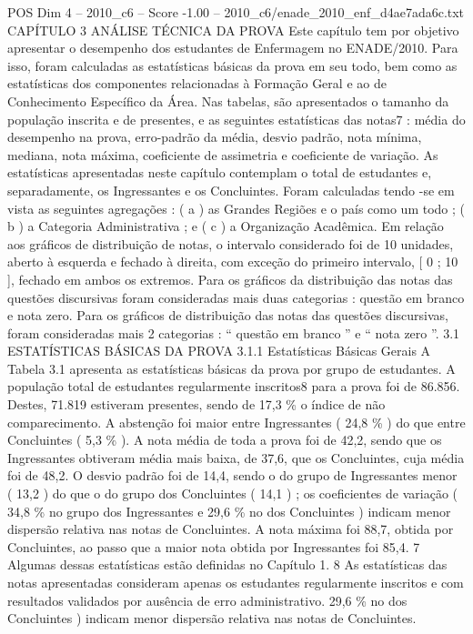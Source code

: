 \begin{textsample}{POS Dim 4 – 2010\_c6 – Score -1.00 – 2010\_c6/enade\_2010\_enf\_d4ae7ada6c.txt}  \label{ex:f4_pos_314}
CAPÍTULO 3 ANÁLISE TÉCNICA DA PROVA Este capítulo tem por objetivo apresentar o desempenho dos estudantes de Enfermagem no ENADE/2010.
Para isso, foram calculadas as estatísticas básicas da prova em seu todo, bem como as estatísticas dos componentes relacionadas à Formação Geral e ao de Conhecimento Específico da Área.
Nas tabelas, são apresentados o tamanho da população inscrita e de presentes, e as seguintes estatísticas das notas7 : média do desempenho na prova, erro-padrão da média, desvio padrão, nota mínima, mediana, nota máxima, coeficiente de assimetria e coeficiente de variação.
As estatísticas apresentadas neste capítulo contemplam o total de estudantes e, separadamente, os Ingressantes e os Concluintes.
Foram calculadas tendo -se em vista as seguintes agregações : ( a ) as Grandes Regiões e o país como um todo ; ( b ) a Categoria Administrativa ; e ( c ) a Organização Acadêmica.
Em relação aos gráficos de distribuição de notas, o intervalo considerado foi de 10 unidades, aberto à esquerda e fechado à direita, com exceção do primeiro intervalo, [ 0 ; 10 ], fechado em ambos os extremos.
Para os gráficos da distribuição das notas das questões discursivas foram consideradas mais duas categorias : questão em branco e nota zero.
Para os gráficos de distribuição das notas das questões discursivas, foram consideradas mais 2 categorias : “ questão em branco ” e “ nota zero ”. 3.1 ESTATÍSTICAS BÁSICAS DA PROVA 3.1.1 Estatísticas Básicas Gerais A Tabela 3.1 apresenta as estatísticas básicas da prova por grupo de estudantes.
A população total de estudantes regularmente inscritos8 para a prova foi de 86.856.
Destes, 71.819 estiveram presentes, sendo de 17,3 \% o índice de não comparecimento.
A abstenção foi maior entre Ingressantes ( 24,8 \% ) do que entre Concluintes ( 5,3 \% ).
A nota média de toda a prova foi de 42,2, sendo que os Ingressantes obtiveram média mais baixa, de 37,6, que os Concluintes, cuja média foi de 48,2.
O desvio padrão foi de 14,4, sendo o do grupo de Ingressantes menor ( 13,2 ) do que o do grupo dos Concluintes ( 14,1 ) ; os coeficientes de variação ( 34,8 \% no grupo dos Ingressantes e 29,6 \% no dos Concluintes ) indicam menor dispersão relativa nas notas de Concluintes.
A nota máxima foi 88,7, obtida por Concluintes, ao passo que a maior nota obtida por Ingressantes foi 85,4. 7 Algumas dessas estatísticas estão definidas no Capítulo 1. 8 As estatísticas das notas apresentadas consideram apenas os estudantes regularmente inscritos e com resultados validados por ausência de erro administrativo. 29,6 \% no dos Concluintes ) indicam menor dispersão relativa nas notas de Concluintes.

\end{textsample}
